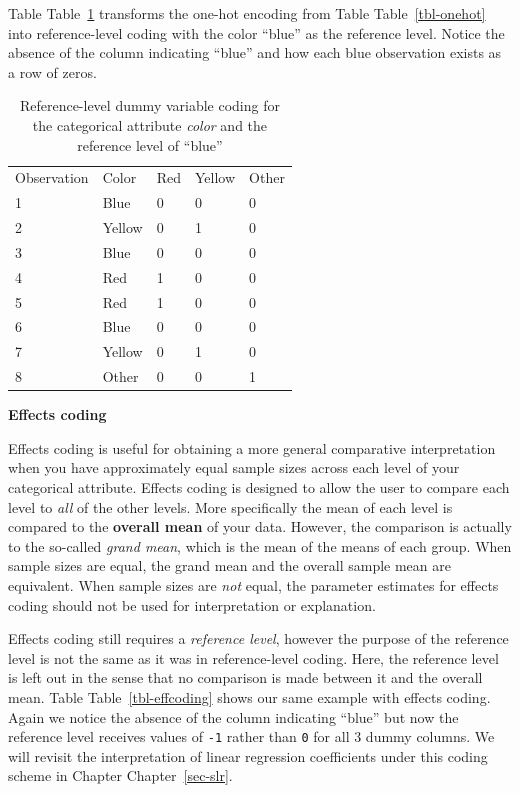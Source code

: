 \documentclass[
  letterpaper,
  DIV=11,
  numbers=noendperiod]{scrreprt}
\begin{document}
Table Table~\ref{tbl-refcoding} transforms the one-hot encoding from
Table Table~\ref{tbl-onehot} into reference-level coding with the color
``blue'' as the reference level. Notice the absence of the column
indicating ``blue'' and how each blue observation exists as a row of
zeros.

\hypertarget{tbl-refcoding}{}
\begin{longtable}[]{@{}lllll@{}}
\caption{\label{tbl-refcoding}Reference-level dummy variable coding for
the categorical attribute \emph{color} and the reference level of
``blue''}\tabularnewline
\toprule()
\endhead
Observation & Color & Red & Yellow & Other \\
1 & Blue & 0 & 0 & 0 \\
2 & Yellow & 0 & 1 & 0 \\
3 & Blue & 0 & 0 & 0 \\
4 & Red & 1 & 0 & 0 \\
5 & Red & 1 & 0 & 0 \\
6 & Blue & 0 & 0 & 0 \\
7 & Yellow & 0 & 1 & 0 \\
8 & Other & 0 & 0 & 1 \\
\bottomrule()
\end{longtable}

\textbf{Effects coding}

Effects coding is useful for obtaining a more general comparative
interpretation when you have approximately equal sample sizes across
each level of your categorical attribute. Effects coding is designed to
allow the user to compare each level to \emph{all} of the other levels.
More specifically the mean of each level is compared to the
\textbf{overall mean} of your data. However, the comparison is actually
to the so-called \emph{grand mean}, which is the mean of the means of
each group. When sample sizes are equal, the grand mean and the overall
sample mean are equivalent. When sample sizes are \emph{not} equal, the
parameter estimates for effects coding should not be used for
interpretation or explanation.

Effects coding still requires a \emph{reference level}, however the
purpose of the reference level is not the same as it was in
reference-level coding. Here, the reference level is left out in the
sense that no comparison is made between it and the overall mean. Table
Table~\ref{tbl-effcoding} shows our same example with effects coding.
Again we notice the absence of the column indicating ``blue'' but now
the reference level receives values of \texttt{-1} rather than
\texttt{0} for all 3 dummy columns. We will revisit the interpretation
of linear regression coefficients under this coding scheme in Chapter
Chapter~\ref{sec-slr}.
\end{document}
